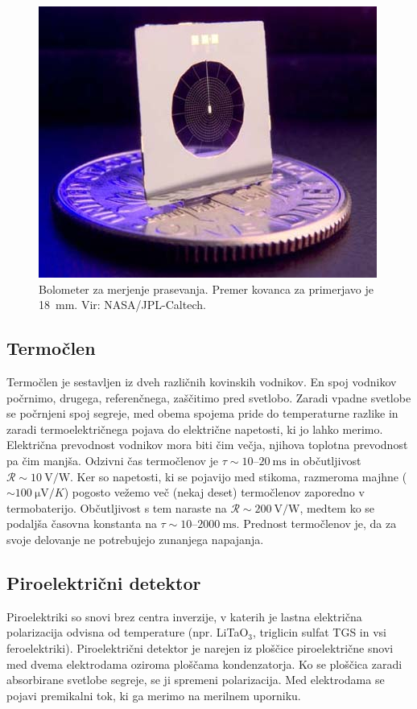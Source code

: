 \begin{figure}[h]
\centering
\includegraphics[width=75truemm]{slike/11_Bolometer.jpg}
\caption{Bolometer za merjenje prasevanja. Premer kovanca za primerjavo je 18~mm. 
Vir: NASA/JPL-Caltech.}
\label{fig:Bolometer}
\end{figure}

\subsection*{Termočlen}
Termočlen je sestavljen iz dveh različnih kovinskih vodnikov. 
En spoj vodnikov počrnimo, drugega, 
referenčnega, zaščitimo pred svetlobo. Zaradi vpadne svetlobe se počrnjeni spoj 
segreje, med obema spojema pride do temperaturne razlike in zaradi termoelektričnega 
pojava do električne napetosti, ki jo lahko merimo. Električna prevodnost
vodnikov mora biti čim večja, njihova toplotna prevodnost pa čim manjša. Odzivni čas termočlenov je 
$\tau \sim 10$--$20~\si{\milli\second}$ in občutljivost $\mathcal{R} \sim 10~\si{\volt/\watt}$.
Ker so napetosti, ki se pojavijo med stikoma, razmeroma majhne 
($\sim 100~\si{\micro\volt/K}$) pogosto vežemo več (nekaj deset) termočlenov zaporedno v
termobaterijo. Občutljivost s tem naraste na $\mathcal{R} \sim 200~\si{\volt/\watt}$, medtem ko se 
podaljša časovna konstanta na $\tau \sim 10$--$2000~\si{\milli\second}$. Prednost termočlenov je,
da za svoje delovanje ne potrebujejo zunanjega napajanja. 

\subsection*{Piroelektrični detektor}
Piroelektriki so snovi brez centra inverzije, 
v katerih je lastna električna 
polarizacija odvisna od temperature (npr. LiTaO$_3$, 
triglicin sulfat TGS in vsi feroelektriki). Piroelektrični detektor je narejen iz 
ploščice piroelektrične snovi med dvema elektrodama oziroma ploščama kondenzatorja.
Ko se ploščica zaradi absorbirane svetlobe segreje, se ji spremeni polarizacija. Med 
elektrodama se pojavi premikalni tok, ki ga merimo na merilnem uporniku.

